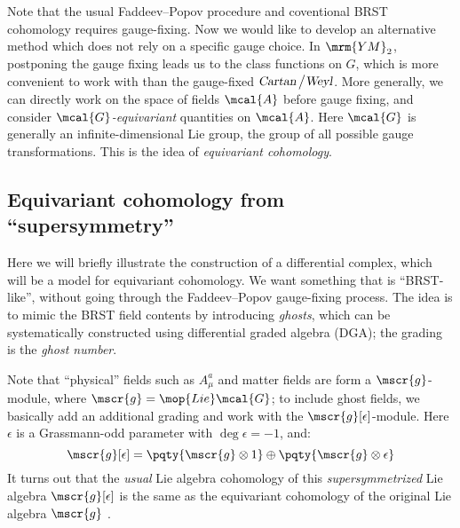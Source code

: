 \documentclass[a4paper
	,10pt
]{article}
\newcommand{\YM}{{\ensuremath{\mrm{YM}_2}}\xspace}
\begin{document}
	Note that the usual Faddeev--Popov procedure and coventional BRST cohomology requires gauge-fixing. Now we would like to develop an alternative method which does not rely on a specific gauge choice. In \YM, postponing the gauge fixing leads us to the class functions on $G$, which is more convenient to work with than the gauge-fixed $\textsl{Cartan} \,\big/ \textsl{Weyl}$. More generally, we can directly work on the space of fields $\mcal{A}$ before gauge fixing, and consider \textit{$\mcal{G}$-equivariant} quantities on $\mcal{A}$. Here $\mcal{G}$ is generally an infinite-dimensional Lie group, the group of all possible gauge transformations. This is the idea of \textit{equivariant cohomology}. 
\subsection{Equivariant cohomology from ``supersymmetry''}
	Here we will briefly illustrate the construction of a differential complex, which will be a model for equivariant cohomology. We want something that is ``BRST-like'', without going through the Faddeev--Popov gauge-fixing process. The idea is to mimic the BRST field contents by introducing \textit{ghosts}, which can be systematically constructed using differential graded algebra (DGA); the grading is the \textit{ghost number}. 
	
	Note that ``physical'' fields such as $A^a_\mu$ and matter fields are form a $\mscr{g}$-module, where $\mscr{g} = \mop{Lie} \mcal{G}$; to include ghost fields, we basically add an additional grading and work with the $\mscr{g}[\epsilon]$-module. Here $\epsilon$ is a Grassmann-odd parameter with $\deg\epsilon = -1$, and:
	\begin{equation}
		\mscr{g}[\epsilon]
		= \pqty{\mscr{g} \otimes 1}
			\oplus \pqty{\mscr{g} \otimes \epsilon}
	\end{equation}
	It turns out that the \textit{usual} Lie algebra cohomology of this \textit{supersymmetrized} Lie algebra $\mscr{g}[\epsilon]$ is the same as the equivariant cohomology of the original Lie algebra $\mscr{g}$ \cite{Cordes:1994fc}. 
	
\end{document}

